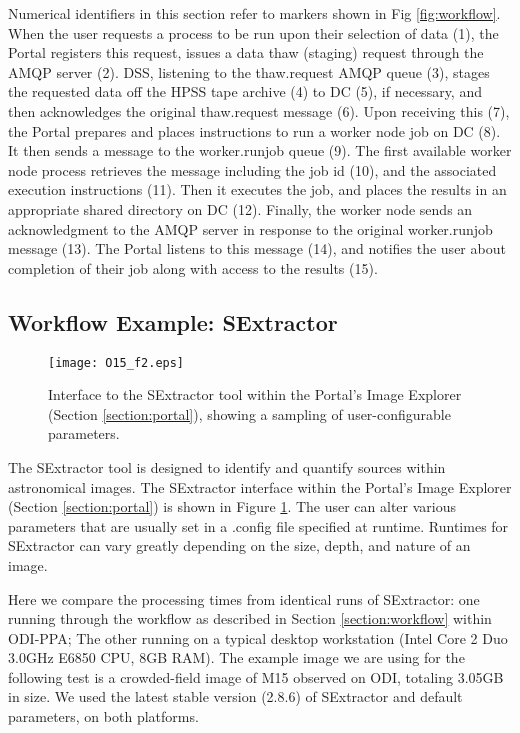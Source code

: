 \documentclass[11pt,twoside]{article}
\begin{document}
Numerical identifiers in this section refer to markers shown in Fig \ref{fig:workflow}.  When the user requests a process to be run upon their selection of data (1), the Portal registers this request, issues a data thaw (staging) request through the AMQP server (2).  DSS, listening to the thaw.request AMQP queue (3), stages the requested data off the HPSS tape archive (4) to DC (5), if necessary, and then acknowledges the original thaw.request message (6).  Upon receiving this (7), the Portal prepares and places instructions to run a worker node job on DC (8).  It then sends a message to the worker.runjob queue (9).   The first available worker node process retrieves the message including the job id (10), and the associated execution instructions (11). Then it executes the job, and places the results in an appropriate shared directory on DC (12).  Finally, the worker node sends an acknowledgment to the AMQP server in response to the original worker.runjob message (13). The Portal listens to this message (14), and notifies the user about completion of their job along with access to the results (15).  

\subsection{Workflow Example: SExtractor}
\label{section:sextractor}

\begin{figure}[ht]
\texttt{[image: O15\_f2.eps]}
\caption{Interface to the SExtractor tool within the Portal's Image Explorer (Section \ref{section:portal}), showing a sampling of user-configurable parameters.}
\label{fig:sextractor}
\end{figure}

The SExtractor tool is designed to identify and quantify sources within astronomical images.  The SExtractor interface within the Portal's Image Explorer (Section \ref{section:portal}) is shown in Figure \ref{fig:sextractor}.  The user can alter various parameters that are usually set in a .config file specified at runtime.  Runtimes for SExtractor can vary greatly depending on the size, depth, and nature of an image.  

Here we compare the processing times from identical runs of SExtractor: one running through the workflow as described in Section \ref{section:workflow} within ODI-PPA; The other running on a typical desktop workstation (Intel Core 2 Duo 3.0GHz E6850 CPU, 8GB RAM). The example image we are using for the following test is a crowded-field image of M15 observed on ODI, totaling 3.05GB in size. We used the latest stable version (2.8.6) of SExtractor and default parameters, on both platforms.
\end{document}
